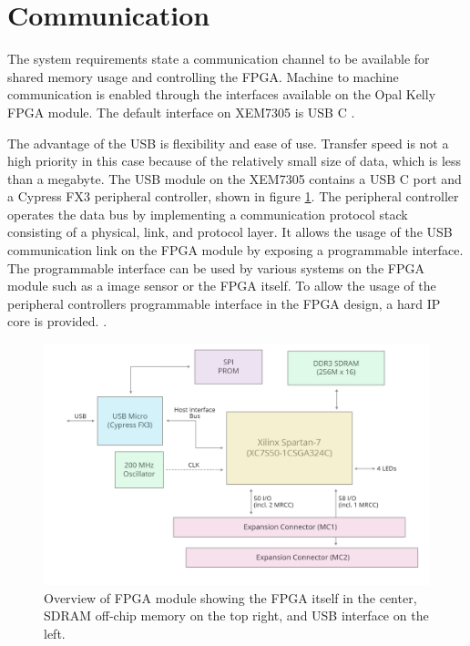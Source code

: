 \documentclass[12pt]{report}
\begin{document}
\section{Communication}
The system requirements state a communication channel to be available for shared memory usage and controlling the FPGA. Machine to machine communication is enabled through the interfaces available on the Opal Kelly FPGA module. The default interface on XEM7305 is USB C \citep{XEM7305Man}.
\par
The advantage of the USB is flexibility and ease of use. Transfer speed is not a high priority in this case because of the relatively small size of data, which is less than a megabyte. The USB module on the XEM7305 contains a USB C port and a Cypress FX3 peripheral controller, shown in figure \ref{fig:xemOverview}.
The peripheral controller operates the data bus by implementing a communication protocol stack consisting of a physical, link, and protocol layer. It allows the usage of the USB communication link on the FPGA module by exposing a programmable interface. The programmable interface can be used by various systems on the FPGA module such as a image sensor or the FPGA itself. To allow the usage of the peripheral controllers programmable interface in the FPGA design, a hard IP core is provided. \citep{XEM7305Man} \citep{FX3Man}.

\begin{figure}
    \centering
    \includegraphics[scale=0.4]{figures/2XEM7305-BlockDiagram.png}
    \caption{Overview of FPGA module showing the FPGA itself in the center, SDRAM off-chip memory on the top right, and USB interface on the left. \citep{XEM7305Man}}
    \label{fig:xemOverview}
\end{figure}
\end{document}
